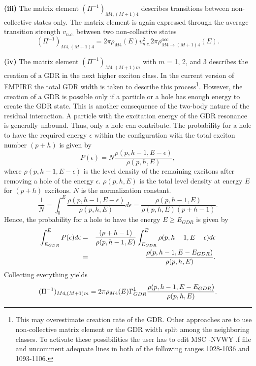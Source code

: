 \smallskip \textbf{(iii)} The matrix element $(\Pi^{-1})_{M4,(M+1)4}$
describes transitions between non-collective states only. The matrix element
is again expressed through the average transition strength $v_{n.c.}$
between two non-collective states
\begin{equation}
(\Pi^{-1})_{M4,(M+1)4}=2\pi\rho_{M4}(E)v_{n.c.}^{2}2\pi\rho_{M4%
\rightarrow(M+1)4}^{acc}(E).
\end{equation}

\smallskip \textbf{(iv)} The matrix element $(\Pi^{-1})_{M4,(M+1)m}$ with $m$
= 1, 2, and 3 describes the creation of a GDR in the next higher exciton
class. In the current version of EMPIRE the total GDR width is taken to
describe this process\footnote{%
This may overestimate creation rate of the GDR. Other approaches are to use
non-collective matrix element or the GDR width split among the neighboring
classes. To activate these possibilities the user has to edit MSC%
-NVWY%
.f file and uncomment adequate lines in both of the following
ranges 1028-1036 and 1093-1106.}. However, the creation of a GDR is possible
only if a particle or a hole has enough energy to create the GDR state. This
is another consequence of the two-body nature of the residual interaction. A
particle with the excitation energy of the GDR resonance is generally
unbound. Thus, only a hole can contribute. The probability for a hole to
have the required energy $\epsilon$ within the configuration with the total
exciton number $(p+h)$ is given by
\begin{equation}
P(\epsilon)=N%
\frac{\rho(p,h-1,E-\epsilon)}{\rho(p,h,E)},
\end{equation}
where $\rho(p,h-1,E-\epsilon)$ is the level density%
 of the remaining excitons after removing a hole
of the energy $\epsilon$. $\rho(p,h,E)$ is the total level density at energy
$E$ for $(p+h)$ excitons. $N$ is the normalization constant.
\begin{equation}
\frac{1}{N}=\int_{0}^{E}\frac{\rho(p,h-1,E-\epsilon)}{\rho(p,h,E)}d\epsilon=%
\frac{\rho(p,h-1,E)}{\rho(p,h,E)(p+h-1)}.
\end{equation}
Hence, the probability for a hole to have the energy $E\geq E_{GDR}$ is
given by
\begin{eqnarray}
\int_{E_{GDR}}^{E}P(\epsilon)d\epsilon & = & \frac{(p+h-1)}{\rho(p,h-1,E)}%
\int_{E_{GDR}}^{E}\rho(p,h-1,E-\epsilon)d\epsilon  \notag \\
& = & \frac{\rho(p,h-1,E-E_{GDR})}{\rho(p,h,E)}.
\end{eqnarray}
Collecting everything yields
\begin{equation}
(\Pi^{-1})_{M4,(M+1)m}=2\pi\rho_{M4}(E)\Gamma_{GDR}^{\downarrow}\frac{%
\rho(p,h-1,E-E_{GDR})}{\rho(p,h,E)}.
\end{equation}

